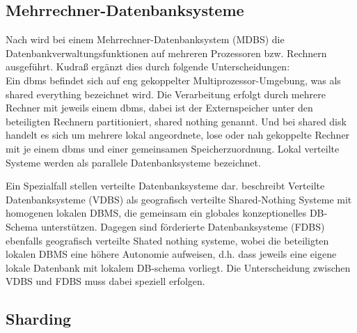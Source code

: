 \subsection{Mehrrechner-Datenbanksysteme}
Nach \cite[S.394]{book:kudrass} wird bei einem Mehrrechner-Datenbanksystem (MDBS) die Datenbankverwaltungsfunktionen auf mehreren Prozessoren bzw. Rechnern ausgeführt.
Kudraß ergänzt dies durch folgende Unterscheidungen:\\
Ein \Gls{dbms} befindet sich auf eng gekoppelter Multiprozessor-Umgebung, was als shared everything bezeichnet wird.
Die Verarbeitung erfolgt durch mehrere Rechner mit jeweils einem \Gls{dbms}, dabei ist der Externspeicher unter den beteiligten Rechnern partitioniert, shared nothing genannt.
Und bei shared disk handelt es sich um mehrere lokal angeordnete, lose oder nah gekoppelte Rechner mit je einem \Gls{dbms} und einer gemeinsamen Speicherzuordnung. Lokal verteilte Systeme werden als parallele Datenbanksysteme bezeichnet.

Ein Spezialfall stellen verteilte Datenbanksysteme dar.
\cite[S.398]{book:kudrass} beschreibt Verteilte Datenbanksysteme (VDBS) als geografisch verteilte Shared-Nothing Systeme mit homogenen lokalen DBMS, die gemeinsam ein globales konzeptionelles DB-Schema unterstützen.
Dagegen sind förderierte Datenbanksysteme (FDBS) ebenfalls geografisch verteilte Shated nothing systeme, wobei die beteiligten lokalen DBMS eine höhere Autonomie aufweisen, d.h. dass jeweils eine eigene lokale Datenbank mit lokalem DB-schema vorliegt.
Die Unterscheidung zwischen VDBS und FDBS muss dabei speziell erfolgen.

%
%
%

\subsection{Sharding}

